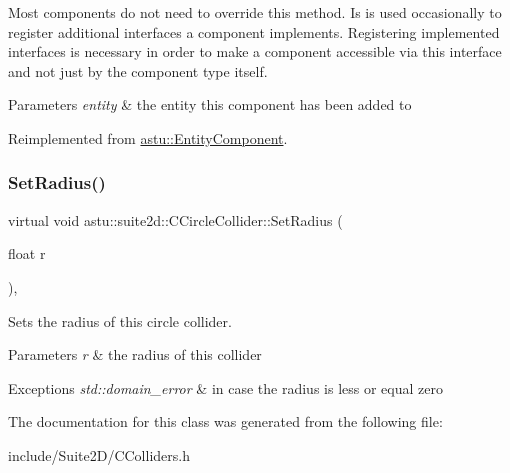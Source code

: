 Most components do not need to override this method. Is is used occasionally to register additional interfaces a component implements. Registering implemented interfaces is necessary in order to make a component accessible via this interface and not just by the component type itself.


\begin{DoxyParams}{Parameters}
{\em entity} & the entity this component has been added to \\
\hline
\end{DoxyParams}


Reimplemented from \hyperlink{classastu_1_1EntityComponent_a8736f12dc9d2be7d2569408fc1040480}{astu\+::\+Entity\+Component}.

\mbox{\label{classastu_1_1suite2d_1_1CCircleCollider_a0f064219591b23beace315bb58f26c78}} 
\subsubsection{\texorpdfstring{Set\+Radius()}{SetRadius()}}
{\footnotesize\ttfamily virtual void astu\+::suite2d\+::\+C\+Circle\+Collider\+::\+Set\+Radius (\begin{DoxyParamCaption}\item[{float}]{r }\end{DoxyParamCaption})\hspace{0.3cm}{\ttfamily [inline]}, {\ttfamily [virtual]}}

Sets the radius of this circle collider.


\begin{DoxyParams}{Parameters}
{\em r} & the radius of this collider \\
\hline
\end{DoxyParams}

\begin{DoxyExceptions}{Exceptions}
{\em std\+::domain\+\_\+error} & in case the radius is less or equal zero \\
\hline
\end{DoxyExceptions}


The documentation for this class was generated from the following file\+:\begin{DoxyCompactItemize}
\item 
include/\+Suite2\+D/C\+Colliders.\+h\end{DoxyCompactItemize}
